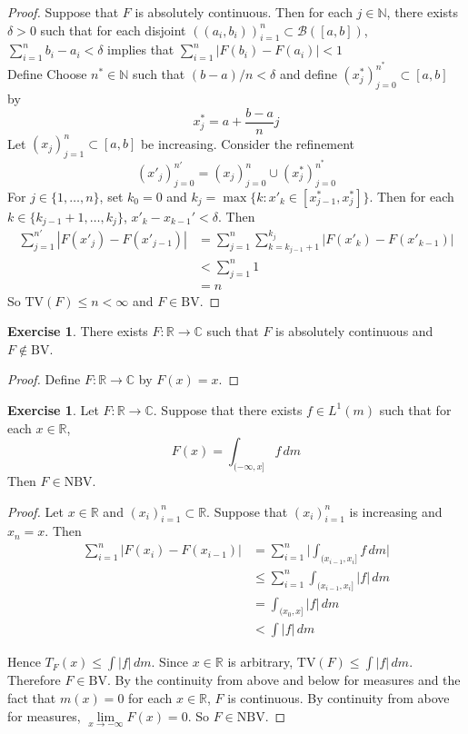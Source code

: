 \documentclass[12pt]{amsart}
\theoremstyle{definition}
\newtheorem{ex}[definition]{Exercise}
\newcommand{\del}{\delta}
\newcommand{\C}{\mathbb{C}}
\newcommand{\N}{\mathbb{N}}
\newcommand{\R}{\mathbb{R}}
\newcommand{\MB}{\mathcal{B}}
\newcommand{\dm}{\, d m}
\newcommand{\BV}{\text{BV}}
\newcommand{\NBV}{\text{NBV}}
\newcommand{\TV}{\text{TV}}
\newcommand{\lex}[1]{\label{ex:#1}}
\begin{document}
	\begin{proof}
	Suppose that $F$ is absolutely continuous. Then for each $j \in \N$, there exists $\del >0$ such that for each disjoint $((a_i, b_i))_{i=1}^n \subset \MB([a,b])$, $\sum\limits_{i=1}^n b_i-a_i < \del$ implies that $\sum\limits_{i=1}^n|F(b_i)-F(a_i)| < 1$ \\
	Define Choose $n^* \in \N$ such that $(b-a)/n < \del$ and define $(x^*_j)_{j=0}^{n^*} \subset [a,b]$ by 
	$$x^*_j = a + \frac{b-a}{n}j$$ 
	Let $(x_j)_{j=1}^n \subset [a,b]$ be increasing. Consider the refinement 
	$$(x'_j)_{j=0}^{n'} = (x_j)_{j=0}^n \cup (x^*_j)_{j=0}^{n^*}$$ 
	For $j \in \{1, \ldots, n\}$, set $k_0 = 0$ and $k_j = \max \{k: x'_k \in [x^*_{j-1}, x^*_j] \}$. Then for each $k \in \{k_{j-1} + 1, \ldots, k_j\}$, $x'_k - x_{k-1}' < \del$. Then 
	\begin{align*}
	\sum_{j=1}^{n'} |F(x'_j) - F(x'_{j-1})| 
	&= \sum_{j=1}^n \sum_{k=k_{j-1}+1}^{k_j} |F(x'_k) - F(x'_{k-1})|  \\
	&< \sum_{j=1}^n 1  \\
	&= n
	\end{align*}
	So $\TV(F) \leq n < \infty$ and $F \in \BV$. 
	\end{proof}
	
	\begin{ex}
	There exists $F:\R \rightarrow \C$ such that $F$ is absolutely continuous and $F \not \in \BV$. 
	\end{ex}	
	
	\begin{proof}
	Define $F: \R \rightarrow \C$ by $F(x) = x$. 
	\end{proof}
	
	\begin{ex} \lex{00000} 
		Let $F: \R \rightarrow \C$. Suppose that there exists $f \in L^1(m)$ such that for each $x \in \R$,
		$$F(x) = \int_{(-\infty, x]}f\dm$$ 
		Then $F \in \NBV$.
	\end{ex}
	
	\begin{proof}
		Let $x \in \R$ and $(x_i)_{i=1}^n \subset \R$. Suppose that $(x_i)_{i=1}^n$ is increasing and $x_n=x$. Then 
		\begin{align*}
			\sum_{i=1}^n|F(x_i)-F(x_{i-1})| 
			&= \sum_{i=1}^n \bigg| \int_{(x_{i-1},x_i]}f\dm \bigg|\\
			& \leq \sum_{i=1}^n \int_{(x_{i-1},x_i]}|f|\dm \\
			& = \int_{(x_0,x]}|f|\dm\\
			& < \int|f|\dm
		\end{align*}
		
		Hence $T_F(x) \leq \int |f|\dm$. Since $x \in \R$ is arbitrary, $\TV(F) \leq \int |f|\dm$. Therefore $F \in \BV$. By the continuity from above and below for measures and the fact that $m({x})=0$ for each $x \in \R$, $F$ is continuous. By continuity from above for measures, $\lim\limits_{x \rightarrow -\infty} F(x) =0$. So $F \in \NBV$.
	\end{proof}
	
\end{document}
